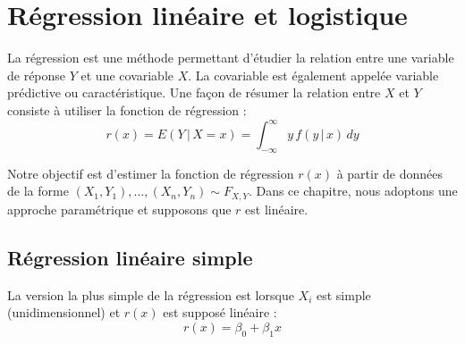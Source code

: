 \documentclass{article}
\begin{document}
\section{Régression linéaire et logistique}

La régression est une méthode permettant d'étudier la relation entre une variable de réponse \( Y \) et une covariable \( X \). La covariable est également appelée variable prédictive ou caractéristique. Une façon de résumer la relation entre \( X \) et \( Y \) consiste à utiliser la fonction de régression :
\[ r(x) = E(Y \,|\, X = x) = \int_{-\infty}^{\infty} y \, f(y \,|\, x) \, dy \]

Notre objectif est d'estimer la fonction de régression \( r(x) \) à partir de données de la forme \( (X_1, Y_1), \ldots, (X_n, Y_n) \sim F_{X,Y} \). Dans ce chapitre, nous adoptons une approche paramétrique et supposons que \( r \) est linéaire.

\subsection{Régression linéaire simple}

La version la plus simple de la régression est lorsque \( X_i \) est simple (unidimensionnel) et \( r(x) \) est supposé linéaire :
\[ r(x) = \beta_0 + \beta_1 x \]
\end{document}
